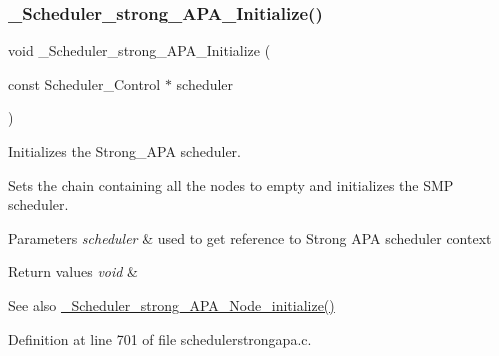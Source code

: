 \subsubsection{\texorpdfstring{\+\_\+\+Scheduler\+\_\+strong\+\_\+\+A\+P\+A\+\_\+\+Initialize()}{\_Scheduler\_strong\_APA\_Initialize()}}
{\footnotesize\ttfamily void \+\_\+\+Scheduler\+\_\+strong\+\_\+\+A\+P\+A\+\_\+\+Initialize (\begin{DoxyParamCaption}\item[{const Scheduler\+\_\+\+Control $\ast$}]{scheduler }\end{DoxyParamCaption})}



Initializes the Strong\+\_\+\+A\+PA scheduler. 

Sets the chain containing all the nodes to empty and initializes the S\+MP scheduler.


\begin{DoxyParams}{Parameters}
{\em scheduler} & used to get reference to Strong A\+PA scheduler context \\
\hline
\end{DoxyParams}

\begin{DoxyRetVals}{Return values}
{\em void} & \\
\hline
\end{DoxyRetVals}
\begin{DoxySeeAlso}{See also}
\hyperlink{group__RTEMSScoreSchedulerStrongAPA_ga1cde4345d4dc0b5a37a696fa446bb47e}{\+\_\+\+Scheduler\+\_\+strong\+\_\+\+A\+P\+A\+\_\+\+Node\+\_\+initialize()} 
\end{DoxySeeAlso}


Definition at line 701 of file schedulerstrongapa.\+c.

\mbox{\label{group__RTEMSScoreSchedulerStrongAPA_ga1cde4345d4dc0b5a37a696fa446bb47e}} 
